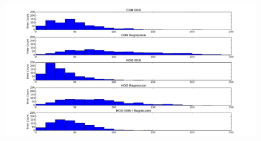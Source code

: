 \documentclass[10pt,twocolumn,letterpaper]{article}
\begin{document}
\begin{figure}
	\begin{center}
		\includegraphics[width=0.9\linewidth]{figures/ClassifierErrorHist.png}
	\end{center}
	\caption{}
	\label{fig:hist}
\end{figure}
\end{document}
